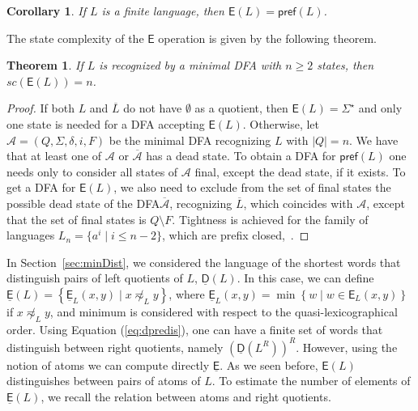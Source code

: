 \documentclass{article}
\newtheorem{theorem}{Theorem}
\newtheorem{corollary}{Corollary}
\newcommand{\dfa}{DFA\xspace}
\newcommand{\comp}[1]{\overline{#1}}
\newcommand{\preff}[1]{\mathsf{pref}(#1)}
\newcommand{\distmin}[1]{\underline{\mathsf{D}}(#1)}
\newcommand{\dpre}[1]{\mathsf{E}(#1)}
\newcommand{\dpreo}{\mathsf{E}}
\newcommand{\dpremin}[1]{\underline{\mathsf{E}}(#1)}
\newcommand{\dpreminw}[2]{\underline{\mathsf{E}}_{#1}(#2)}
\newcommand{\dprew}[2]{\mathsf{E}_{#1}(#2)}
\newcommand{\dpremino}{\underline{\mathsf{E}}}
\newcommand{\mnleq}[1]{\eqsim_{#1}}
\newcommand{\Set}[1]{\left\{ #1 \right\}}
\begin{document}
\begin{corollary}
\label{cor:dprefinite}
  If $L$ is a finite language, then $\dpre{L}=\preff{L}$.
\end{corollary}

The state complexity of the $\dpreo$ operation is given by the following theorem.
\begin{theorem}
\label{theo:scdpre}
If $L$ is recognized by a minimal \dfa with $n\geq 2$ states, then
 $sc(\dpre{L})=n$.
\end{theorem}
\begin{proof}
 If both $L$ and $\comp{L}$ do not have $\emptyset$ as a quotient, then $\dpre{L}=\Sigma^\star$ 
and only one state is needed for a \dfa accepting $\dpre{L}$. 
Otherwise, let $\mathcal{A}=(Q,\Sigma,\delta,i,F)$ be the minimal \dfa recognizing $L$ with $|Q|=n$.
We have that at least one of $\mathcal{A}$ or $\comp{\mathcal{A}}$ has a dead state. 
To obtain a \dfa for $\preff{L}$ one needs only to  consider all states of $\mathcal{A}$ final, except the dead state, if it exists. 
To get a \dfa for $\dpre{L}$, we also need to exclude from the set of final states the possible dead state of the \dfa $\comp{\mathcal{A}}$, recognizing $\comp{L}$, which coincides with $\mathcal{A}$, except that the set of final states is $Q\setminus F$. Tightness is achieved  for the family of languages $L_n=\{a^i\mid i\leq n-2\}$, which are prefix closed,~\cite{brzozowski14:_quotien_compl_of_closed_languag}.\end{proof}

In Section~\ref{sec:minDist}, we considered the language of the shortest words that distinguish pairs of left quotients of $L$, $\distmin{L}$. 
In this case, we can define $\dpremin{L}=\Set{\dpreminw{L}{x,y} \mid  x\not\mnleq{L} y}$, where
$\dpreminw{L}{x,y} = \min\Set{w\mid w\in \dprew{L}{x,y}}
$ if $x\not\mnleq{L} y$, and minimum is considered with respect to the quasi-lexicographical order. 
Using Equation (\ref{eq:dpredis}), one can have a finite set of words that distinguish between right quotients, namely $(\distmin{L^R})^R$.
However, using the notion of atoms we can compute directly $\dpremino$.
As we seen before, $\dpre{L}$ distinguishes between pairs of atoms of $L$. To estimate the number of elements of $\dpremin{L}$, we recall the relation between atoms and right quotients.
\end{document}
